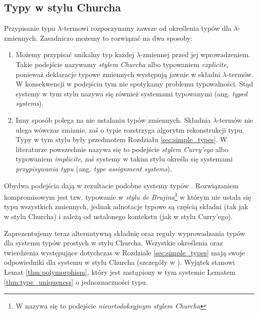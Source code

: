 \subsection{Typy w stylu Churcha}\label{subsec:church_style}
Przypisanie typu \(\lambda\)-termowi rozpoczynamy zawsze od określenia typów dla \(\lambda\)-zmiennych. Zasadniczo możemy to rozwiązać na dwa sposoby:

\begin{enumerate}
  \item Możemy przypisać unikalny typ każdej \(\lambda\)-zmiennej przed jej wprowadzeniem. Takie podejście nazywamy \emph{stylem Churcha} albo typowaniem \emph{explicite}, ponieważ deklaracje typowe zmiennych występują jawnie w składni \(\lambda\)-termów. W konsekwencji w podejściu tym nie spotykamy problemu typowalności. Stąd systemy w tym stylu nazywa się również systemami {typowanymi} (ang. \emph{typed systems}).
  \item Inny sposób polega na nie ustalaniu typów zmiennych. Składnia \(\lambda\)-termów nie ulega wówczas zmianie, zaś o typie rozstrzyga algorytm rekonstrukcji typu. Typy w tym stylu były przedmotem Rozdziału \ref{sec:simple_types}. W literaturze powszechnie nazywa się to podejście \emph{stylem Curry'ego} albo typowaniem \emph{implicite}, zaś systemy w takim stylu określa się systemami \emph{przypisywania typu} (ang. \emph{type assignment systems}).
\end{enumerate}

Obydwa podejścia dają w rezultacie podobne systemy typów \cite[Rozdział 3.4]{Urzyczyn2006}.  %
Rozwiązaniem kompromisowym jest tzw. typowanie w \emph{stylu de Brujina}\footnote{W \cite{Urzyczyn2006} nazywa się to podejście \emph{nieortodoksyjnym stylem Churcha}} \cite[1A.33]{barendregt_dekkers_statman_2013} w którym nie ustala się typu wszystkich zmiennych, jednak adnotacje typowe są częścią składni (tak jak w stylu Churcha) i zależą od ustalonego kontekstu (jak w stylu Curry'ego). 

Zaprezentujemy teraz alternatywną składnię oraz reguły wyprowadzania typów dla systemu typów prostych w stylu Churcha. Wszystkie określenia oraz twierdzenia występujące dotychczas w Rozdziale \ref{sec:simple_types} mają swoje odpowiedniki dla systemu w stylu Churcha (szczegóły w \cite[Rozdział 2.10]{nederpelt_geuvers_2014}). Wyjątek stanowi Lemat \ref{thm:polymorphism}, który jest zastąpiony w tym systemie Lematem \ref{thm:type_uniqueness} o jednoznaczności typu.

